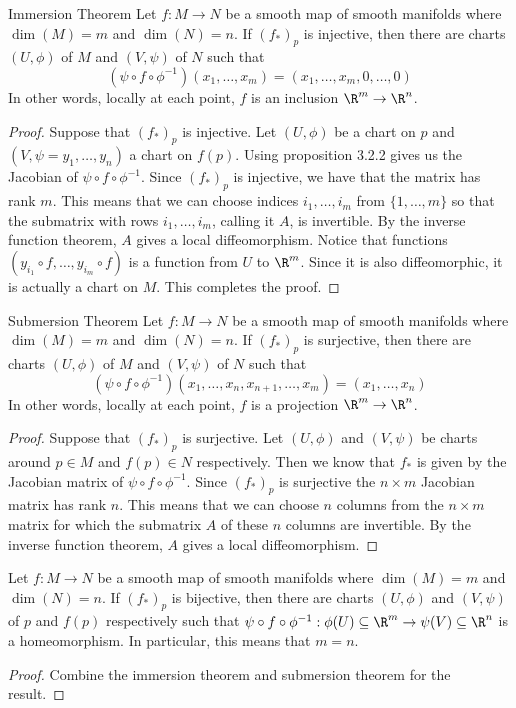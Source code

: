 \documentclass[a4paper]{article}
\begin{document}
\begin{thm}{Immersion Theorem}{} Let $f:M\to N$ be a smooth map of smooth manifolds where $\dim(M)=m$ and $\dim(N)=n$. If $(f_\ast)_p$ is injective, then there are charts $(U,\phi)$ of $M$ and $(V,\psi)$ of $N$ such that $$(\psi\circ f\circ\phi^{-1})(x_1,\dots,x_m)=(x_1,\dots,x_m,0,\dots,0)$$ In other words, locally at each point, $f$ is an inclusion $\R^m\to\R^n$. \tcbline
\begin{proof}
Suppose that $(f_\ast)_p$ is injective. Let $(U,\phi)$ be a chart on $p$ and $(V,\psi=y_1,\dots,y_n)$ a chart on $f(p)$. Using proposition 3.2.2 gives us the Jacobian of $\psi\circ f\circ\phi^{-1}$. Since $(f_\ast)_p$ is injective, we have that the matrix has rank $m$. This means that we can choose indices $i_1,\dots,i_m$ from $\{1,\dots,m\}$ so that the submatrix with rows $i_1,\dots,i_m$, calling it $A$, is invertible. By the inverse function theorem, $A$ gives a local diffeomorphism. Notice that functions $(y_{i_1}\circ f,\dots,y_{i_m}\circ f)$ is a function from $U$ to $\R^m$. Since it is also diffeomorphic, it is actually a chart on $M$. This completes the proof. 
\end{proof}
\end{thm}

\begin{thm}{Submersion Theorem}{} Let $f:M\to N$ be a smooth map of smooth manifolds where $\dim(M)=m$ and $\dim(N)=n$. If $(f_\ast)_p$ is surjective, then there are charts $(U,\phi)$ of $M$ and $(V,\psi)$ of $N$ such that $$(\psi\circ f\circ\phi^{-1})(x_1,\dots,x_n,x_{n+1},\dots,x_m)=(x_1,\dots,x_n)$$ In other words, locally at each point, $f$ is a projection $\R^m\to\R^n$. \tcbline
\begin{proof}
Suppose that $(f_\ast)_p$ is surjective. Let $(U,\phi)$ and $(V,\psi)$ be charts around $p\in M$ and $f(p)\in N$ respectively. Then we know that $f_\ast$ is given by the Jacobian matrix of $\psi\circ f\circ\phi^{-1}$. Since $(f_\ast)_p$ is surjective the $n\times m$ Jacobian matrix has rank $n$. This means that we can choose $n$ columns from the $n\times m$ matrix for which the submatrix $A$ of these $n$ columns are invertible. By the inverse function theorem, $A$ gives a local diffeomorphism. 
\end{proof}
\end{thm}

\begin{crl}{}{} Let $f:M\to N$ be a smooth map of smooth manifolds where $\dim(M)=m$ and $\dim(N)=n$. If $(f_\ast)_p$ is bijective, then there are charts $(U,\phi)$ and $(V,\psi)$ of $p$ and $f(p)$ respectively such that $\psi\circ f\circ\phi^{-1}:\phi(U)\subseteq\R^m\to\psi(V)\subseteq\R^n$ is a homeomorphism. In particular, this means that $m=n$. \tcbline
\begin{proof}
Combine the immersion theorem and submersion theorem for the result. 
\end{proof}
\end{crl}
\end{document}
